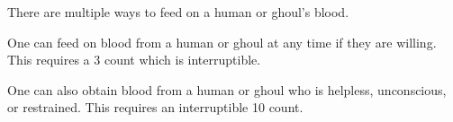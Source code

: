 \documentclass[green]{guildcamp4}
\begin{document}
\name{\gFeeding{}}

There are multiple ways to feed on a human or ghoul's blood.

One can feed on blood from a human or ghoul at any time if they are willing. This requires a 3 count which is interruptible.

One can also obtain blood from a human or ghoul who is helpless, unconscious, or restrained. This requires an interruptible 10 count.
\end{document}
